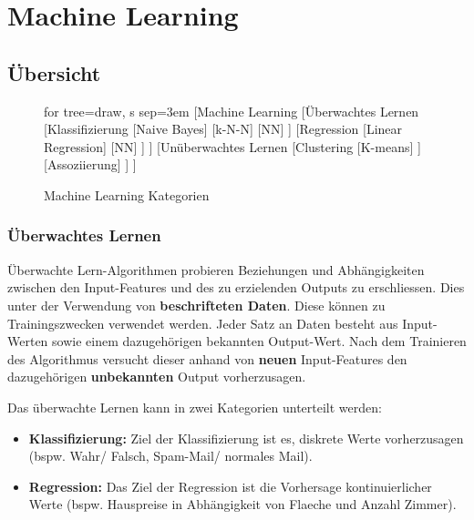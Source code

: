 \newpage
\section{Machine Learning}
\label{sec:ml}

\subsection{Übersicht}

\begin{figure}[H]
	\centering
	\label{fig:ml_overview}
	\begin{forest}
	for tree={draw, s sep=3em}
	[Machine Learning
	    [Überwachtes Lernen
	        [Klassifizierung
	            [Naive Bayes]
	             [k-N-N]
	             [NN]
	        ]
	        [Regression
	            [Linear Regression]
	            [NN]
	        ]
	    ]
	    [Unüberwachtes Lernen
	        [Clustering
	            [K-means]
	        ]
	        [Assoziierung]
	    ]
	]
	\end{forest}
	\caption{Machine Learning Kategorien}
\end{figure}

\subsubsection{Überwachtes Lernen}
\begin{flushleft}

Überwachte Lern-Algorithmen probieren Beziehungen und Abhängigkeiten zwischen den Input-Features und des zu erzielenden Outputs zu erschliessen. Dies unter der Verwendung von \textbf{beschrifteten Daten}. Diese können zu Trainingszwecken verwendet werden. Jeder Satz an Daten besteht aus Input-Werten sowie einem dazugehörigen bekannten Output-Wert. Nach dem Trainieren des Algorithmus versucht dieser anhand von \textbf{neuen} Input-Features den dazugehörigen \textbf{unbekannten} Output vorherzusagen.
\linebreak

Das überwachte Lernen kann in zwei Kategorien unterteilt werden:

\begin{itemize}
	\item \textbf{Klassifizierung:} Ziel der Klassifizierung ist es, diskrete Werte vorherzusagen (bspw. Wahr/ Falsch, Spam-Mail/ normales Mail). 
	\item \textbf{Regression:} Das Ziel der Regression ist die Vorhersage kontinuierlicher Werte (bspw. Hauspreise in Abhängigkeit von Flaeche und Anzahl Zimmer).
\end{itemize}

\end{flushleft}

